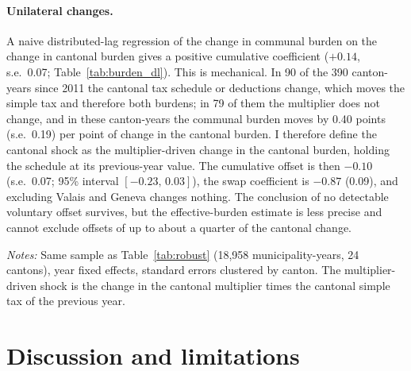 \documentclass[11pt,a4paper]{article}
\begin{document}
\paragraph{Unilateral changes.} A naive distributed-lag regression of the change in communal burden on the change in cantonal burden gives a positive cumulative coefficient ($+0.14$, s.e.\ 0.07; Table~\ref{tab:burden_dl}). This is mechanical. In 90 of the 390 canton-years since 2011 the cantonal tax schedule or deductions change, which moves the simple tax and therefore both burdens; in 79 of them the multiplier does not change, and in these canton-years the communal burden moves by 0.40 points (s.e.\ 0.19) per point of change in the cantonal burden. I therefore define the cantonal shock as the multiplier-driven change in the cantonal burden, holding the schedule at its previous-year value. The cumulative offset is then $-0.10$ (s.e.\ 0.07; 95\% interval $[-0.23,\,0.03]$), the swap coefficient is $-0.87$ (0.09), and excluding Valais and Geneva changes nothing. The conclusion of no detectable voluntary offset survives, but the effective-burden estimate is less precise and cannot exclude offsets of up to about a quarter of the cantonal change.

\begin{table}[t]\centering\small
\caption{Effective-burden check of the voluntary offset}\label{tab:burden_dl}

\vspace{2pt}\parbox{\textwidth}{\footnotesize \emph{Notes:} Same sample as Table~\ref{tab:robust} (18,958 municipality-years, 24 cantons), year fixed effects, standard errors clustered by canton. The multiplier-driven shock is the change in the cantonal multiplier times the cantonal simple tax of the previous year.}
\end{table}

\section{Discussion and limitations}\label{sec:disc}
\end{document}
